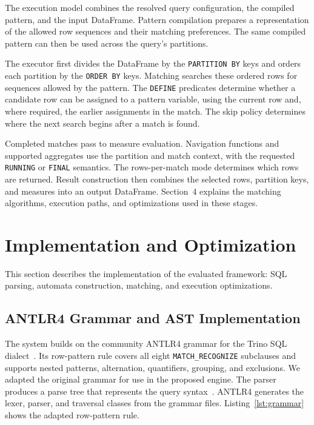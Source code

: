 \documentclass[preprint,12pt,times,a4paper]{elsarticle}
\begin{document}
The execution model combines the resolved query configuration, the compiled
pattern, and the input DataFrame. Pattern compilation prepares a representation
of the allowed row sequences and their matching preferences. The same compiled
pattern can then be used across the query's partitions.

The executor first divides the DataFrame by the \texttt{PARTITION BY} keys and
orders each partition by the \texttt{ORDER BY} keys. Matching searches these
ordered rows for sequences allowed by the pattern. The \texttt{DEFINE}
predicates determine whether a candidate row can be assigned to a pattern
variable, using the current row and, where required, the earlier assignments in
the match. The skip policy determines where the next search begins after a
match is found.

Completed matches pass to measure evaluation. Navigation functions and
supported aggregates use the partition and match context, with the requested
\texttt{RUNNING} or \texttt{FINAL} semantics. The rows-per-match mode determines
which rows are returned. Result construction then combines the selected rows,
partition keys, and measures into an output DataFrame. Section~4 explains the
matching algorithms, execution paths, and optimizations used in these stages.

\section{Implementation and Optimization}

This section describes the implementation of the evaluated framework:
SQL parsing, automata construction, matching, and execution optimizations.

\subsection{ANTLR4 Grammar and AST Implementation}

The system builds on the community ANTLR4 grammar for the Trino SQL
dialect~\cite{antlr_trino_sql}. Its row-pattern rule covers all eight
\texttt{MATCH\_RECOGNIZE} subclauses and supports nested patterns,
alternation, quantifiers, grouping, and exclusions. We adapted the original
grammar for use in the proposed engine.
The parser produces a parse tree that represents the query
syntax~\cite{parr2013definitive,antlr_trino_sql}. ANTLR4 generates the lexer,
parser, and traversal classes from the grammar files. Listing~\ref{lst:grammar}
shows the adapted row-pattern rule.
\end{document}
